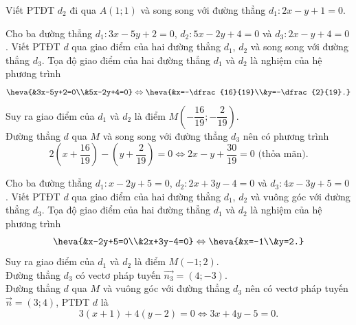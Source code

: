 	\begin{bt}%
		Viết PTĐT $d_2$ đi qua $A\left(1;1\right)$ và song song với đường thẳng $d_1\colon 2x-y+1=0$.
	\end{bt}
	\begin{bt}%
		Cho ba đường thẳng $d_1\colon 3x-5y+2=0$, $d_2\colon 5x-2y+4=0$ và $d_3\colon 2x-y+4=0$. Viết PTĐT $d$ qua giao điểm của hai đường thẳng $d_1$, $d_2$ và song song với đường thẳng $d_3$.
		\loigiai
		{Tọa độ giao điểm của hai đường thẳng $d_1$ và $d_2$ là nghiệm của hệ phương trình 
			$$\heva{&3x-5y+2=0\\&5x-2y+4=0} \Leftrightarrow \heva{&x=-\dfrac{16}{19}\\&y=-\dfrac{2}{19}.}$$
			Suy ra giao điểm của $d_1$ và $d_2$ là điểm $M\left(-\dfrac{16}{19};-\dfrac{2}{19}\right)$.\\
			Đường thẳng $d$ qua $M$ và song song với đường thẳng $d_3$ nên có phương trình
			$$2\left(x+\dfrac{16}{19}\right)-\left(y+\dfrac{2}{19}\right)=0 \Leftrightarrow 2x-y+\dfrac{30}{19}=0 \text{ (thỏa mãn)}.$$}
	\end{bt}
	\begin{bt}%
		Cho ba đường thẳng $d_1\colon x-2y+5=0$, $d_2\colon 2x+3y-4=0$ và $d_3\colon 4x-3y+5=0$. Viết PTĐT $d$ qua giao điểm của hai đường thẳng $d_1$, $d_2$ và vuông góc với đường thẳng $d_3$.
		\loigiai
		{Tọa độ giao điểm của hai đường thẳng $d_1$ và $d_2$ là nghiệm của hệ phương trình 
			$$\heva{&x-2y+5=0\\&2x+3y-4=0} \Leftrightarrow \heva{&x=-1\\&y=2.}$$
			Suy ra giao điểm của $d_1$ và $d_2$ là điểm $M\left(-1;2\right)$.\\
			Đường thẳng $d_3$ có vectơ pháp tuyến $\overrightarrow{n_3}=(4;-3)$.\\
			Đường thẳng $d$ qua $M$ và vuông góc với đường thẳng $d_3$ nên có vectơ pháp tuyến $\overrightarrow{n}=(3;4)$, PTĐT $d$ là
			$$3\left(x+1\right)+4\left(y-2\right)=0 \Leftrightarrow 3x+4y-5=0.$$}
	\end{bt}
	

